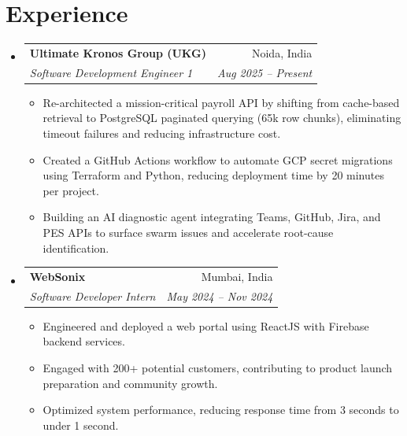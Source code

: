 \documentclass[a4paper,11pt]{article}
\makeatletter
\newcommand{\resumeItem}[1]{
  \item \small{#1 \vspace{-2pt}}
}
\newcommand{\resumeSubheading}[4]{
  \vspace{-2pt}\item
  \begin{tabular*}{\textwidth}{l@{\extracolsep{\fill}}r}
    \textbf{#1} & #2 \\
    \textit{#3} & \textit{#4} \\
  \end{tabular*}\vspace{-6pt}
}
\newcommand{\resumeItemListStart}{\begin{itemize}[leftmargin=0.15in]}
\newcommand{\resumeItemListEnd}{\end{itemize}}
\makeatother
\begin{document}
\section{Experience}
\begin{itemize}[leftmargin=0.15in]

  \resumeSubheading
    {Ultimate Kronos Group (UKG)}{Noida, India}
    {Software Development Engineer 1}{Aug 2025 -- Present}

    \resumeItemListStart
      \resumeItem{Re-architected a mission-critical payroll API by shifting from cache-based retrieval to PostgreSQL paginated querying (65k row chunks), eliminating timeout failures and reducing infrastructure cost.}
      \resumeItem{Created a GitHub Actions workflow to automate GCP secret migrations using Terraform and Python, reducing deployment time by 20 minutes per project.}
      \resumeItem{Building an AI diagnostic agent integrating Teams, GitHub, Jira, and PES APIs to surface swarm issues and accelerate root-cause identification.}
    \resumeItemListEnd

  \resumeSubheading
    {WebSonix}{Mumbai, India}
    {Software Developer Intern}{May 2024 -- Nov 2024}

    \resumeItemListStart
      \resumeItem{Engineered and deployed a web portal using ReactJS with Firebase backend services.}
      \resumeItem{Engaged with 200+ potential customers, contributing to product launch preparation and community growth.}
      \resumeItem{Optimized system performance, reducing response time from 3 seconds to under 1 second.}
    \resumeItemListEnd

\end{itemize}

\end{document}
